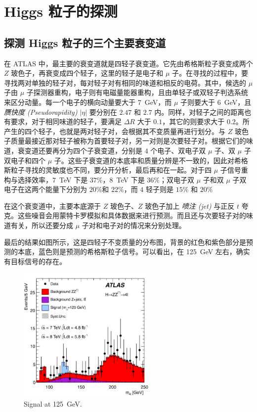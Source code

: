 \chapter{Higgs 粒子的探测}

\section{探测 Higgs 粒子的三个主要衰变道}

在 ATLAS 中，最主要的衰变道就是四轻子衰变道。它先由希格斯粒子衰变成两个 $Z$ 玻色子，再衰变成四个轻子，这里的轻子是电子和 $\mu$ 子。在寻找的过程中，要寻找两对单独的轻子对，每对轻子对有相同的味道和相反的电荷。其中，候选的 $\mu$ 子由 $\mu$ 子探测器重构，电子则有电磁量能器重构，且由单轻子或双轻子判选系统来区分动量。每一个电子的横向动量要大于 \qty{7}{GeV}，而 $\mu$ 子则要大于 \qty{6}{GeV}，且 \emph{赝快度 (Pseudorapidity)} $|\eta|$ 要分别在 $2.47$ 和 $2.7$ 内。同样，对轻子之间的距离也有要求，对于相同味道的轻子，要满足 $\Delta R$ 大于 $0.1$，其它的则要求大于 $0.2$。所产生的四个轻子，也就是两对轻子对，会根据其不变质量再进行划分。与 $Z$ 玻色子质量最接近那对轻子被称为首要轻子对，另一对则是次要轻子对。根据它们的味道，衰变道还要再分为四个子衰变道，分别是 $4$ 个电子、双电子双 $\mu$ 子、双 $\mu$ 子双电子和四个 $\mu$ 子。这些子衰变道的本底率和质量分辨是不一致的，因此对希格斯粒子寻找的灵敏度也不同，要分开分析，最后再和在一起。对于四 $\mu$ 子信号重构与选择效率，\qty{7}{TeV} 下是 $37\%$，\qty{8}{TeV} 下是 $36\%$；双电子双 $\mu$ 子和双 $\mu$ 子双电子在这两个能量下分别为 $20\%$和 $22\%$，而 $4$ 轻子则是 $15\%$ 和 $20\%$

在这个衰变道中，主要本底源于 $Z$ 玻色子、$Z$ 玻色子加上 \emph{喷注 (jet)} 与正反 $t$ 夸克。这些噪音会用蒙特卡罗模拟和具体数据来进行预测。而且还与次要轻子对的味道有关，所以还要分成 $\mu$ 子对和电子对的情况来分别处理。

最后的结果如图所示，这是四轻子不变质量的分布图，背景的红色和紫色部分是预测的本底，蓝色则是预测的希格斯粒子信号。可以看出，在 \qty{125}{GeV} 左右，确实有目标信号的存在。

\begin{figure}[htbp]
    \centering
    \includegraphics[width=0.6\textwidth]{pic/events.png}
    \caption{Signal at \qty{125}{GeV}.}
    \label{fig:events}
\end{figure}

